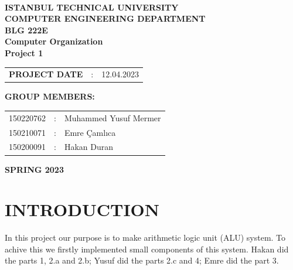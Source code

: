 \documentclass[pdftex,12pt,a4paper]{article}
\begin{document}
\begin{titlepage}
\begin{center}
\textbf{}\\
\textbf{\Large{ISTANBUL TECHNICAL UNIVERSITY}}\\
\vspace{0.5cm}
\textbf{\Large{COMPUTER ENGINEERING DEPARTMENT}}\\
\vspace{2cm}
\textbf{\Large{BLG 222E\\ Computer Organization \\ Project 1}}\\
\vspace{2.8cm}
\begin{table}[ht]
\centering
\Large{
\begin{tabular}{lcl}
\textbf{PROJECT DATE}  & : & 12.04.2023\\
\end{tabular}}
\end{table}
\vspace{1cm}
\textbf{\Large{GROUP MEMBERS:}}\\
\begin{table}[ht]
\centering
\Large{
\begin{tabular}{rcl}
150220762  & : & Muhammed Yusuf Mermer  \\
150210071  & : & Emre Çamlıca \\
150200091  & : & Hakan Duran \\
\end{tabular}}
\end{table}
\vspace{2.8cm}
\textbf{\Large{SPRING 2023}}

\end{center}

\end{titlepage}

\thispagestyle{empty}
\setcounter{tocdepth}{4}
\tableofcontents
\clearpage

\setcounter{page}{1}
\section{INTRODUCTION}
In this project our purpose is to make arithmetic logic unit (ALU) system. To achive 
this we firstly implemented small components of this system. Hakan did the parts 1, 2.a and 2.b; 
Yusuf did the parts 2.c and 4; Emre did the part 3.
\end{document}
